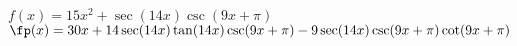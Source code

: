 {$f(x)=15x^2 + \sec(14x)\csc(9x+\pi)$
}
{$\fp(x) = 30x + 14\sec(14x)\tan(14x)\csc(9x+\pi) - 9\sec(14x)\csc(9x+\pi)\cot(9x+\pi)$
}
